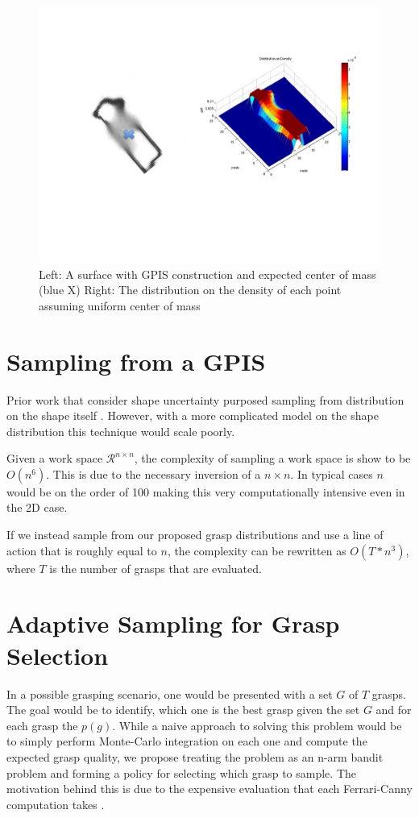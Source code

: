 \documentclass[letterpaper, 10 pt, conference]{ieeeconf}  %
\begin{document}
\begin{figure}[ht!]
\centering
\includegraphics[scale = 0.3]{figures/Slide06.jpg}
\caption{Left: A surface with GPIS construction and expected center of mass (blue X)
Right: The distribution on the density of each point assuming uniform center of mass}
\vspace*{-10pt}
\label{fig:GPIS_MASS}
\end{figure}

\section{Sampling from a GPIS}
Prior work that consider shape uncertainty purposed sampling from distribution on the shape itself \cite{kehoe2012toward}. However, with a more complicated model on the shape distribution this technique would scale poorly. 

Given a work space $\mathcal{R}^{n\times n}$, the complexity of sampling a work space is show to be $O(n^6)$. This is due to the necessary inversion of a $n \times n$. In typical cases $n$ would be on the order of 100 making this very computationally intensive even in the 2D case. 

If we instead sample from our proposed grasp distributions and use a line of action that is roughly equal to $n$, the complexity can be rewritten as $O(T*n^3)$,  where $T$ is the number of grasps that are evaluated. 


\section{Adaptive Sampling for Grasp Selection}
In a possible grasping scenario, one would be presented with a set $G$ of $T$ grasps. The goal would be to identify, which one is the best grasp given the set $G$ and for each grasp the $p(g)$. While a naive approach to solving this problem would be to simply perform Monte-Carlo integration on each one and compute the expected grasp quality, we propose treating the problem as an n-arm bandit problem and forming a policy for selecting which grasp to sample. The motivation behind this is due to the expensive evaluation that each Ferrari-Canny computation takes \cite{ferrari1992}.
\end{document}
